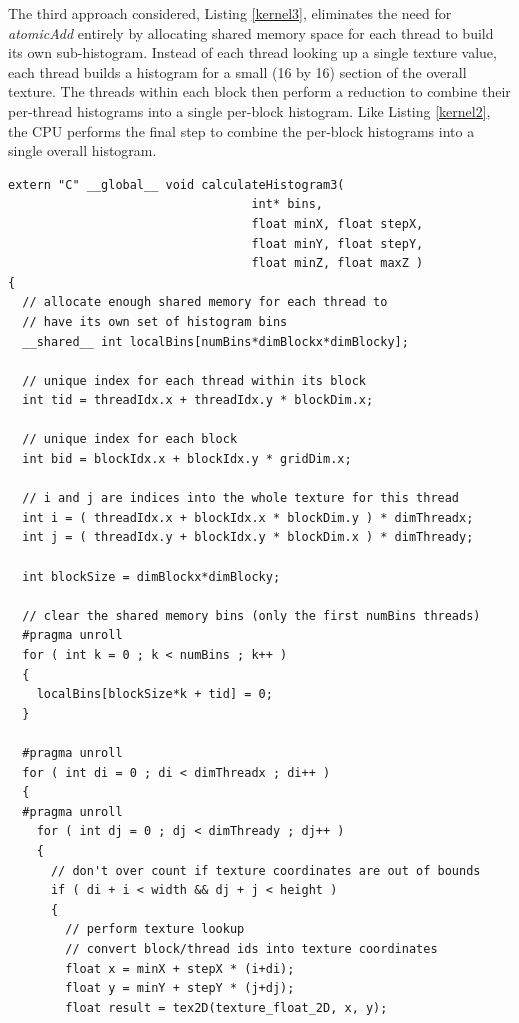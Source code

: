 \documentclass{article}
\begin{document}
The third approach considered, Listing \ref{kernel3}, eliminates the need for \emph{atomicAdd} entirely by allocating shared memory space for each thread to build its own sub-histogram. Instead of each thread looking up a single texture value, each thread builds a histogram for a small (16 by 16) section of the overall texture\cite{histogram-calculation}. The threads within each block then perform a reduction to combine their per-thread histograms into a single per-block histogram\cite{tree-reduction}. Like Listing \ref{kernel2}, the CPU performs the final step to combine the per-block histograms into a single overall histogram.

\lstset{language=C,basicstyle=\footnotesize}
\begin{lstlisting}[caption={calculateHistogram3: Per-Thread Sub-Histograms},label={kernel3}]
extern "C" __global__ void calculateHistogram3(
                                  int* bins,
                                  float minX, float stepX,
                                  float minY, float stepY,
                                  float minZ, float maxZ )
{
  // allocate enough shared memory for each thread to
  // have its own set of histogram bins
  __shared__ int localBins[numBins*dimBlockx*dimBlocky];

  // unique index for each thread within its block
  int tid = threadIdx.x + threadIdx.y * blockDim.x;

  // unique index for each block
  int bid = blockIdx.x + blockIdx.y * gridDim.x;

  // i and j are indices into the whole texture for this thread
  int i = ( threadIdx.x + blockIdx.x * blockDim.y ) * dimThreadx;
  int j = ( threadIdx.y + blockIdx.y * blockDim.x ) * dimThready;

  int blockSize = dimBlockx*dimBlocky;

  // clear the shared memory bins (only the first numBins threads)
  #pragma unroll
  for ( int k = 0 ; k < numBins ; k++ ) 
  {
    localBins[blockSize*k + tid] = 0;
  }

  #pragma unroll
  for ( int di = 0 ; di < dimThreadx ; di++ )
  {
  #pragma unroll
    for ( int dj = 0 ; dj < dimThready ; dj++ )
    {
      // don't over count if texture coordinates are out of bounds
      if ( di + i < width && dj + j < height )
      {
        // perform texture lookup
        // convert block/thread ids into texture coordinates
        float x = minX + stepX * (i+di);
        float y = minY + stepY * (j+dj);
        float result = tex2D(texture_float_2D, x, y);


\end{lstlisting}
\end{document}
